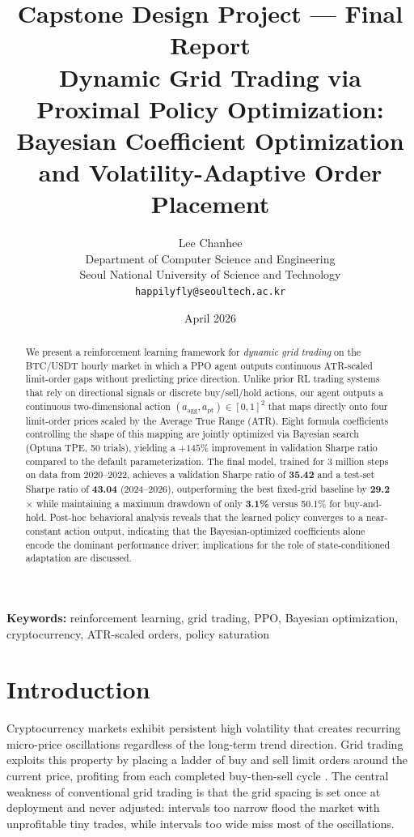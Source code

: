 \documentclass[11pt, a4paper]{article}
\title{
    \vspace{-1cm}
    {\large Capstone Design Project — Final Report}\\[0.8em]
    \textbf{Dynamic Grid Trading via Proximal Policy Optimization:\\
    Bayesian Coefficient Optimization and Volatility-Adaptive Order Placement}
}
\author{
    Lee Chanhee\\
    Department of Computer Science and Engineering\\
    Seoul National University of Science and Technology\\
    \texttt{happilyfly@seoultech.ac.kr}
}
\date{April 2026}
\begin{document}
\maketitle
\thispagestyle{empty}

\begin{abstract}
We present a reinforcement learning framework for \emph{dynamic grid trading} on the
BTC/USDT hourly market in which a PPO agent outputs continuous ATR-scaled limit-order
gaps without predicting price direction.
Unlike prior RL trading systems that rely on directional signals or discrete
buy/sell/hold actions, our agent outputs a continuous two-dimensional action
$(a_\text{agg}, a_\text{pt}) \in [0,1]^2$ that maps directly onto four limit-order
prices scaled by the Average True Range (ATR).
Eight formula coefficients controlling the shape of this mapping are jointly optimized
via Bayesian search (Optuna TPE, 50 trials), yielding a \(+145\%\) improvement in
validation Sharpe ratio compared to the default parameterization.
The final model, trained for 3 million steps on data from 2020--2022, achieves a
validation Sharpe ratio of \textbf{35.42} and a test-set Sharpe ratio of \textbf{43.04}
(2024--2026), outperforming the best fixed-grid baseline by \textbf{29.2$\times$}
while maintaining a maximum drawdown of only \textbf{3.1\%} versus 50.1\% for
buy-and-hold.
Post-hoc behavioral analysis reveals that the learned policy converges to a
near-constant action output, indicating that the Bayesian-optimized coefficients
alone encode the dominant performance driver; implications for the role of
state-conditioned adaptation are discussed.
\end{abstract}

\vspace{1em}
\noindent\textbf{Keywords:} reinforcement learning, grid trading, PPO, Bayesian optimization,
cryptocurrency, ATR-scaled orders, policy saturation

\newpage
\tableofcontents
\newpage

\section{Introduction}

Cryptocurrency markets exhibit persistent high volatility that creates recurring
micro-price oscillations regardless of the long-term trend direction.
Grid trading exploits this property by placing a ladder of buy and sell limit orders
around the current price, profiting from each completed buy-then-sell cycle
\citep{sun2023rl}.
The central weakness of conventional grid trading is that the grid spacing is set
once at deployment and never adjusted: intervals too narrow flood the market with
unprofitable tiny trades, while intervals too wide miss most of the oscillations.
\end{document}
